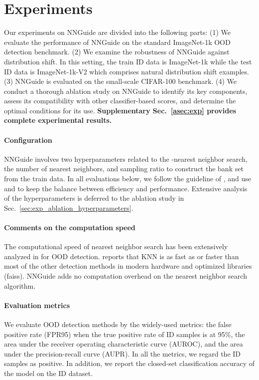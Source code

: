 \documentclass[10pt,twocolumn,letterpaper]{article}
\begin{document}
\section{Experiments}
\label{sec:exp}
Our experiments on NNGuide are divided into the following parts: (1) We evaluate the performance of NNGuide on the standard ImageNet-1k OOD detection benchmark. (2) We examine the robustness of NNGuide against distribution shift.
In this setting, the train ID data is ImageNet-1k while the test ID data is ImageNet-1k-V2 which comprises natural distribution shift examples. (3) NNGuide is evaluated on the small-scale CIFAR-100 \cite{krizhevsky2009learning} benchmark. (4) We conduct a thorough ablation study on NNGuide to identify its key components, assess its compatibility with other classifier-based scores, and determine the optimal conditions for its use. 
\textbf{Supplementary Sec.~\ref{asec:exp} provides complete experimental results.}


\paragraph{Configuration}
NNGuide involves two hyperparameters related to the -nearest neighbor search, \ie the number  of nearest neighbors, and sampling ratio  to construct the bank set from the train data. In all evaluations below, we follow the guideline of \cite{sun2022out}, and use  and  to keep the balance between efficiency and performance. Extensive analysis of the hyperparameters is deferred to the ablation study in Sec.~\ref{sec:exp_ablation_hyperparameters}.

\paragraph{Comments on the computation speed}
The computational speed of nearest neighbor search has been extensively analyzed in \cite{sun2022out} for OOD detection. \cite{sun2022out} reports that KNN is as fast as or faster than most of the other detection methods in modern hardware and optimized libraries (\eg faiss). NNGuide adds no computation overhead on the nearest neighbor search algorithm.



\paragraph{Evaluation metrics}
We evaluate OOD detection methods by the widely-used metrics: the false positive rate (FPR95) when the true positive rate of ID samples is at 95\%,  the area under the receiver operating characteristic curve (AUROC), and the area under the precision-recall curve (AUPR). In all the metrics, we regard the ID samples as positive. 
In addition, we report the closed-set classification accuracy of the model on the ID dataset.
\end{document}
